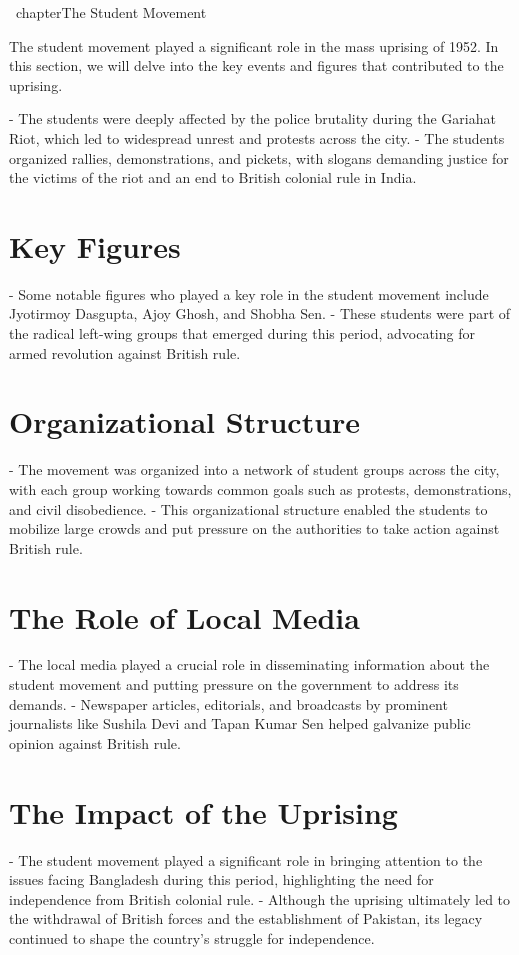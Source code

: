 \ chapter{The Student Movement}

 The student movement played a significant role in the mass uprising of 1952. In this section, we will delve into the key events and figures that contributed to the uprising.

- The students were deeply affected by the police brutality during the Gariahat Riot, which led to widespread unrest and protests across the city.
- The students organized rallies, demonstrations, and pickets, with slogans demanding justice for the victims of the riot and an end to British colonial rule in India.

\section{Key Figures}

- Some notable figures who played a key role in the student movement include Jyotirmoy Dasgupta, Ajoy Ghosh, and Shobha Sen.
- These students were part of the radical left-wing groups that emerged during this period, advocating for armed revolution against British rule.

\section{Organizational Structure}

- The movement was organized into a network of student groups across the city, with each group working towards common goals such as protests, demonstrations, and civil disobedience.
- This organizational structure enabled the students to mobilize large crowds and put pressure on the authorities to take action against British rule.

\section{The Role of Local Media}

- The local media played a crucial role in disseminating information about the student movement and putting pressure on the government to address its demands.
- Newspaper articles, editorials, and broadcasts by prominent journalists like Sushila Devi and Tapan Kumar Sen helped galvanize public opinion against British rule.

\section{The Impact of the Uprising}

- The student movement played a significant role in bringing attention to the issues facing Bangladesh during this period, highlighting the need for independence from British colonial rule.
- Although the uprising ultimately led to the withdrawal of British forces and the establishment of Pakistan, its legacy continued to shape the country's struggle for independence.